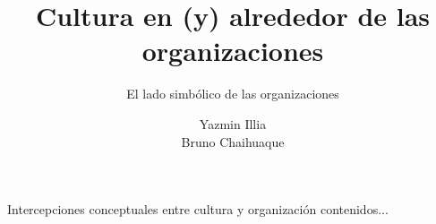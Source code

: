 \documentclass[aspectratio=169]{beamer}
\title{Cultura en (y) alrededor de las organizaciones }
\subtitle{El lado simbólico de las organizaciones}
\author{Yazmin Illia \\ Bruno Chaihuaque\orcidlink{0000-0001-5982-8505}}
\begin{document}
	\begin{frame}
		\titlepage
	\end{frame}
	\begin{frame}{Intercepciones conceptuales entre cultura y organización}
		contenidos...
	\end{frame}
	
\end{document}
